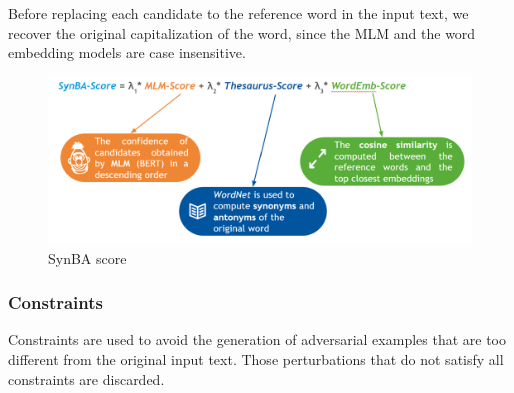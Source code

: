 Before replacing each candidate to the reference word in the input text, we recover the original capitalization of the word, since the MLM and the word embedding models are case insensitive.

\begin{figure}
    \centering
    \includegraphics[width=0.8\linewidth]{images/3_3_synba_score.png}
    \caption{SynBA score}
    \label{fig:3_3_synba_score}
\end{figure}


\subsubsection{Constraints}\label{subsubsec:constraints}

Constraints are used to avoid the generation of adversarial examples that are too different from the original input text.
Those perturbations that do not satisfy all constraints are discarded.

